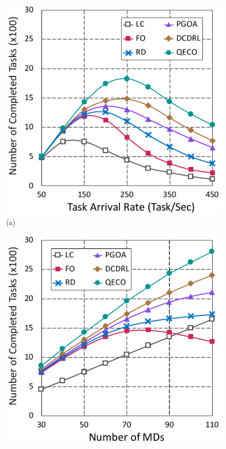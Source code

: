 \documentclass[12pt,draftclsnofoot,onecolumn]{IEEEtran}
\begin{document}
\begin{enumerate}
\begin{figure}[H]\centering
	\captionsetup{name=Fig.}
	\begin{minipage}[b]{0.3\linewidth}
		\centering
		\includegraphics[width=\textwidth]{ drop_1} 
		\textcolor{white}{i}\hspace{0.6cm}(a)
	\end{minipage}
	\hspace{-0.2cm}
	\begin{minipage}[b]{0.3\linewidth}
		\centering
		\includegraphics[width=\textwidth]{ drop_2}

\end{minipage}
\end{figure}
\end{enumerate}
\end{document}
